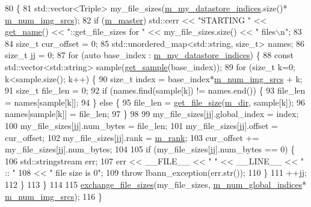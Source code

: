 \begin{DoxyCode}
80                                              \{
81   std::vector<Triple> my\_file\_sizes(\hyperlink{classlbann_1_1generic__data__store_abd38f8d8aab0648959e09d011abfe20a}{m\_my\_datastore\_indices}.size()*
      \hyperlink{classlbann_1_1data__store__image_a2f660053e7621a9cc70a7c4eef53c9cc}{m\_num\_img\_srcs});
82   \textcolor{keywordflow}{if} (\hyperlink{classlbann_1_1generic__data__store_a143fd33ef3a53180bc62745e369c16f8}{m\_master}) std::cerr << \textcolor{stringliteral}{"STARTING "} << \hyperlink{classlbann_1_1generic__data__store_a53140adb8f7c2348986916a1abb85ffa}{get\_name}() << \textcolor{stringliteral}{"::get\_file\_sizes for "} << 
      my\_file\_sizes.size() << \textcolor{stringliteral}{" files\(\backslash\)n"};
83 
84   \textcolor{keywordtype}{size\_t} cur\_offset = 0;
85   std::unordered\_map<std::string, size\_t> names;
86   \textcolor{keywordtype}{size\_t} jj = 0;
87   \textcolor{keywordflow}{for} (\textcolor{keyword}{auto} base\_index : \hyperlink{classlbann_1_1generic__data__store_abd38f8d8aab0648959e09d011abfe20a}{m\_my\_datastore\_indices}) \{
88     \textcolor{keyword}{const} std::vector<std::string> sample(\hyperlink{classlbann_1_1data__store__multi__images_a39108690484fe407efafefe6a4b0947b}{get\_sample}(base\_index));
89     \textcolor{keywordflow}{for} (\textcolor{keywordtype}{size\_t} k=0; k<sample.size(); k++) \{
90       \textcolor{keywordtype}{size\_t} index = base\_index*\hyperlink{classlbann_1_1data__store__image_a2f660053e7621a9cc70a7c4eef53c9cc}{m\_num\_img\_srcs} + k; 
91       \textcolor{keywordtype}{size\_t} file\_len = 0;
92       \textcolor{keywordflow}{if} (names.find(sample[k]) != names.end()) \{
93         file\_len = names[sample[k]];
94       \} \textcolor{keywordflow}{else} \{
95         file\_len = \hyperlink{classlbann_1_1generic__data__store_a7641d15eba63426acf5071acb8026442}{get\_file\_size}(\hyperlink{classlbann_1_1generic__data__store_ab479c127f00ce550c7433b90e40a5a3d}{m\_dir}, sample[k]);
96         names[sample[k]] = file\_len;
97       \}
98 
99       my\_file\_sizes[jj].global\_index = index;
100       my\_file\_sizes[jj].num\_bytes = file\_len;
101       my\_file\_sizes[jj].offset = cur\_offset;
102       my\_file\_sizes[jj].rank = \hyperlink{classlbann_1_1generic__data__store_a87695bfd2d1ed0dbe01d99108e3f68b7}{m\_rank};
103       cur\_offset += my\_file\_sizes[jj].num\_bytes;
104 
105       \textcolor{keywordflow}{if} (my\_file\_sizes[jj].num\_bytes == 0) \{
106         std::stringstream err;
107         err << \_\_FILE\_\_ << \textcolor{stringliteral}{" "} << \_\_LINE\_\_ << \textcolor{stringliteral}{" :: "}
108           << \textcolor{stringliteral}{" file size is 0"};
109         \textcolor{keywordflow}{throw} lbann\_exception(err.str());
110       \}
111       ++jj;
112     \}
113   \}
114 
115   \hyperlink{classlbann_1_1data__store__image_a477529f2ba3f86598bbd409d3c2b6901}{exchange\_file\_sizes}(my\_file\_sizes, \hyperlink{classlbann_1_1generic__data__store_a0dfa2ffa01845b84ca477fb3e14a36c6}{m\_num\_global\_indices}*
      \hyperlink{classlbann_1_1data__store__image_a2f660053e7621a9cc70a7c4eef53c9cc}{m\_num\_img\_srcs});
116 \}
\end{DoxyCode}
